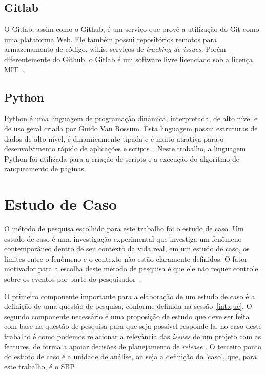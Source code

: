\subsection{Gitlab}
\label{met:tec:gitlab}
O Gitlab, assim como o Github, é um serviço que provê a utilização do Git como uma plataforma Web. Ele também possui repositórios remotos para armazenamento de código, wikis, serviços de \textit{tracking de issues}. Porém diferentemente do Github, o Gitlab é um software livre licenciado sob a licença MIT~\cite{gitlab}.

\subsection{Python}
\label{met:tec:python}
Python é uma linguagem de programação dinâmica, interpretada, de alto nível e de  uso geral criada por Guido Van Rossum. Esta linguagem possui estruturas de dados de alto nível, é dinamicamente tipada e é muito atrativa para o desenvolvimento rápido de aplicações e scripts~\cite{python}. Neste trabalho, a linguagem Python foi utilizada para a criação de scripts e a execução do algoritmo de ranqueamento de páginas.

\section{Estudo de Caso}
\label{met:est}



O método de pesquisa escolhido para este trabalho foi o estudo de caso. Um estudo de caso é uma investigação experimental que investiga um fenômeno contemporâneo dentro de seu contexto da vida real, em um estudo de caso, os limites entre o fenômeno e o contexto não estão claramente definidos. O fator motivador para a escolha deste método de pesquisa é que ele não requer controle sobre os eventos por parte do pesquisador~\cite{yin}.

O primeiro componente importante para a elaboração de um estudo de caso é a definição de uma questão de pesquisa, conforme definida na sessão~\ref{int:que}. O segundo componente necessário é uma proposição de estudo que deve ser feita com base na questão de pesquisa para que seja possível responde-la, no caso deste trabalho é como podemos relacionar a relevância das \textit{issues} de um projeto com as features, de forma a apoiar decisões de planejamento de \textit{release} . O terceiro ponto do estudo de caso é a unidade de análise, ou seja a definição do 'caso', que, para este trabalho, é o SBP.

